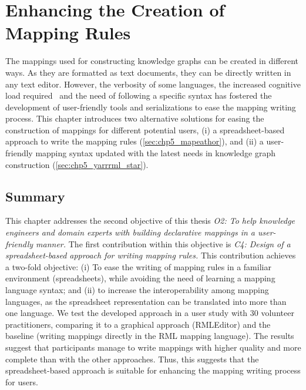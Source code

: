 
\chapter{Enhancing the Creation of Mapping Rules}
\label{chapter:creation}

The mappings used for constructing knowledge graphs can be created in different ways. As they are formatted as text documents, they can be directly written in any text editor. However, the verbosity of some languages, the increased cognitive load required~\parencite{junior2018mental} and the need of following a specific syntax has fostered the development of user-friendly tools and serializations to ease the mapping writing process. This chapter introduces two alternative solutions for easing the construction of mappings for different potential users, (i) a spreadsheet-based approach to write the mapping rules (\cref{sec:chp5_mapeathor}), and (ii) a user-friendly mapping syntax updated with the latest needs in knowledge graph construction (\cref{sec:chp5_yarrrml_star}).





\section{Summary}

This chapter addresses the second objective of this thesis \textit{O2: To help knowledge engineers and domain experts with building declarative mappings in a user-friendly manner.}
The first contribution within this objective is \textit{C4: Design of a spreadsheet-based approach for writing mapping rules.} This contribution achieves a two-fold objective: (i) To ease the writing of mapping rules in a familiar environment (spreadsheets), while avoiding the need of learning a mapping language syntax; and (ii) to increase the interoperability among mapping languages, as the spreadsheet representation can be translated into more than one language. We test the developed approach in a user study with 30 volunteer practitioners, comparing it to a graphical approach (RMLEditor) and the baseline (writing mappings directly in the RML mapping language). The results suggest that participants manage to write mappings with higher quality and more complete than with the other approaches. Thus, this suggests that the spreadsheet-based approach is suitable for enhancing the mapping writing process for users. 

